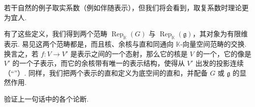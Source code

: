 \begin{remark*}
若干自然的例子取实系数（例如伴随表示），但我们将会看到，取复系数时理论更为宜人.
\end{remark*}
有了这些定义，我们得到两个范畴 $\operatorname{Rep}_{\mathbb K}(G)$ 与 $\operatorname{Rep}_{\mathbb K}(\mathfrak g)$，其对象为有限维表示. 易见这两个范畴都是，而且核、余核与直和同通向 $\mathbb K$-向量空间范畴的交换. 换言之，若 $f:V\longrightarrow V'$ 是表示之间的一个态射，那么它的核是 $V$ 的一个，它的像是 $V'$ 的一个子表示，而它的余核带有唯一的表示结构，使得从 $V'$ 出发的投影连续（``''）. 同样，我们把两个表示的直和定义为底空间的直和，并配备 $G$ 或 $\mathfrak g$ 的显然作用.
\begin{exercise*}
验证上一句话中的各个论断.
\end{exercise*}

